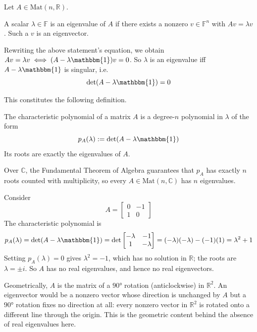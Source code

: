 		Let $A \in \mathrm{Mat}(n,\mathbb{R})$.
		
		\begin{definition}
			\label{def:eigenvalue-eigenvector}
			A scalar $\lambda \in \mathbb{F}$ is an eigenvalue of $A$ if there exists a nonzero $v \in \mathbb{F}^n$ with $Av = \lambda v$. Such a $v$ is an eigenvector.
		\end{definition}
		
		Rewriting the above statement's equation, we obtain $Av = \lambda v \iff (A - \lambda \mathbbm{1})v = 0$. So $\lambda$ is an eigenvalue iff $A - \lambda\mathbbm{1}$ is singular, i.e.
		\[
			\det(A - \lambda\mathbbm{1}) = 0
		\]
		
		\noindent This constitutes the following definition.
		
		\begin{definition}
			\label{def:characteristic-polynomial}
			The characteristic polynomial of a matrix $A$ is a degree-$n$ polynomial in $\lambda$ of the form
			\[
				p_A(\lambda) := \det(A - \lambda\mathbbm{1})
			\]
			Its roots are exactly the eigenvalues of $A$.
		\end{definition}
		
		\begin{remark}
			\label{rem:existence-eigenvalues-complex}
			Over $\mathbb{C}$, the Fundamental Theorem of Algebra guarantees that $p_A$ has exactly $n$ roots counted with multiplicity, so every $A \in \mathrm{Mat}(n,\mathbb{C})$ has $n$ eigenvalues.
		\end{remark}
		
		\begin{example}
			\label{ex:no-real-eigenvalues}
			Consider
			\[
				A = \begin{bmatrix} 0 & -1 \\ 1 & 0 \end{bmatrix}
			\]
			The characteristic polynomial is
			\[
				p_A(\lambda) = \det(A - \lambda \mathbbm{1}) = \det \begin{bmatrix} -\lambda & -1 \\ 1 & -\lambda \end{bmatrix} = (-\lambda)(-\lambda) - (-1)(1) = \lambda^2 + 1
			\]
			Setting $p_A(\lambda) = 0$ gives $\lambda^2 = -1$, which has no solution in $\mathbb{R}$; the roots are $\lambda = \pm i$. So $A$ has no real eigenvalues, and hence no real eigenvectors.
			
			Geometrically, $A$ is the matrix of a $90°$ rotation (anticlockwise) in $\mathbb{R}^2$. An eigenvector would be a nonzero vector whose direction is unchanged by $A$ but a $90°$ rotation fixes no direction at all: every nonzero vector in $\mathbb{R}^2$ is rotated onto a different line through the origin. This is the geometric content behind the absence of real eigenvalues here.
		\end{example}
		
